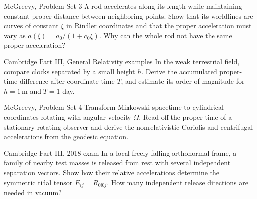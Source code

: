 \begin{exercise}{McGreevy, Problem Set 3}
A rod accelerates along its length while maintaining constant proper distance
between neighboring points.  Show that its worldlines are curves of constant
\(\xi\) in Rindler coordinates and that the proper acceleration must vary as
\(a(\xi)=a_0/(1+a_0\xi)\).  Why can the whole rod not have the same proper
acceleration?
\end{exercise}

\begin{exercise}{Cambridge Part III, General Relativity examples}
In the weak terrestrial field, compare clocks separated by a small height
\(h\).  Derive the accumulated proper-time difference after coordinate time
\(T\), and estimate its order of magnitude for \(h=1\,\mathrm{m}\) and
\(T=1\) day.
\end{exercise}

\begin{exercise}{McGreevy, Problem Set 4}
Transform Minkowski spacetime to cylindrical coordinates rotating with
angular velocity \(\Omega\).  Read off the proper time of a stationary
rotating observer and derive the nonrelativistic Coriolis and centrifugal
accelerations from the geodesic equation.
\end{exercise}

\begin{exercise}{Cambridge Part III, 2018 exam}
In a local freely falling orthonormal frame, a family of nearby test masses is
released from rest with several independent separation vectors.  Show how
their relative accelerations determine the symmetric tidal tensor
\(E_{ij}=R_{0\ii0j}\).  How many independent release directions are needed in
vacuum?
\end{exercise}
